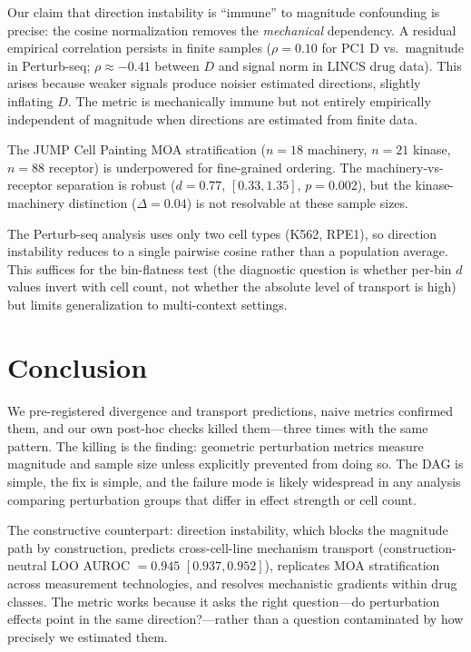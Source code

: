 \documentclass[11pt]{article}
\begin{document}
Our claim that direction instability is ``immune'' to magnitude
confounding is precise: the cosine normalization removes the
\emph{mechanical} dependency. A residual empirical correlation persists
in finite samples ($\rho = 0.10$ for PC1 D vs.\ magnitude in
Perturb-seq; $\rho \approx -0.41$ between $D$ and signal norm in LINCS
drug data). This arises because weaker signals produce noisier estimated
directions, slightly inflating $D$. The metric is mechanically immune but
not entirely empirically independent of magnitude when directions are
estimated from finite data.

The JUMP Cell Painting MOA stratification ($n = 18$ machinery, $n = 21$
kinase, $n = 88$ receptor) is underpowered for fine-grained ordering.
The machinery-vs-receptor separation is robust ($d = 0.77$, $[0.33,
1.35]$, $p = 0.002$), but the kinase-machinery distinction ($\Delta =
0.04$) is not
resolvable at these sample sizes.

The Perturb-seq analysis uses only two cell types (K562, RPE1), so
direction instability reduces to a single pairwise cosine rather than
a population average. This suffices for the bin-flatness test (the
diagnostic question is whether per-bin $d$ values invert with cell
count, not whether the absolute level of transport is high) but limits
generalization to multi-context settings.

\section{Conclusion}

We pre-registered divergence and transport predictions, naive metrics
confirmed them, and our own post-hoc checks killed them---three times
with the same pattern. The killing is the finding: geometric
perturbation metrics measure magnitude and sample size unless explicitly
prevented from doing so. The DAG is simple, the fix is simple, and the
failure mode is likely widespread in any analysis comparing perturbation
groups that differ in effect strength or cell count.

The constructive counterpart: direction instability, which blocks the
magnitude path by construction, predicts cross-cell-line mechanism
transport (construction-neutral LOO AUROC $= 0.945$ $[0.937, 0.952]$),
replicates MOA stratification across measurement technologies, and
resolves mechanistic gradients within drug classes. The metric works
because it asks the right question---do perturbation effects point in the
same direction?---rather than a question contaminated by how precisely
we estimated them.
\end{document}
